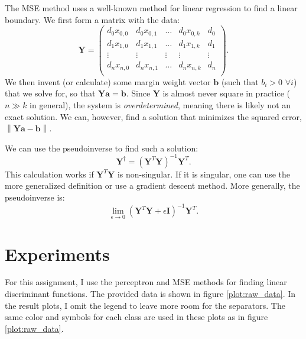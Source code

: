 \documentclass{article}
\begin{document}
The MSE method uses a well-known method for linear regression to find a linear
boundary. We first form a matrix with the data:
\[
	\mathbf{Y} = \left(
	\begin{array}{ccccc}
		d_0x_{0,0} & d_0x_{0,1} & \dots & d_0x_{0,k} & d_0 \\
		d_1x_{1,0} & d_1x_{1,1} & \dots & d_1x_{1,k} & d_1 \\
		\vdots &\vdots &\vdots &\vdots &\vdots \\
		d_nx_{n,0} & d_nx_{n,1} & \dots & d_nx_{n,k} & d_n \\
	\end{array}
	\right).
\]
We then invent (or calculate) some margin weight vector $\mathbf{b}$ (such that
$b_i > 0$ $\forall i$) that we solve for, so that
$\mathbf{Y}\mathbf{a}=\mathbf{b}$. Since $\mathbf{Y}$ is almost never square in
practice ($n\gg k$ in general), the system is {\it overdetermined}, meaning
there is likely not an exact solution. We can, however, find a solution that
minimizes the squared error, $\left\| \mathbf{Y}\mathbf{a} - \mathbf{b}
\right\|$. 

We can use the pseudoinverse to find such a solution:
\[
	\mathbf{Y}^{\dagger} = (\mathbf{Y}^T\mathbf{Y})^{-1} \mathbf{Y}^T.
\]
This calculation works if $\mathbf{Y}^T\mathbf{Y}$ is non-singular. If it is
singular, one can use the more generalized definition or use a gradient descent
method. More generally, the pseudoinverse is:
\[
	\lim_{\epsilon \rightarrow 0} (\mathbf{Y}^T\mathbf{Y} +
\epsilon\mathbf{I})^{-1} \mathbf{Y}^T.
\]

\section{Experiments}

For this assignment, I use the perceptron and MSE methods for finding linear
discriminant functions. The provided data is shown in figure
\ref{plot:raw_data}. In the result plots, I omit the legend to leave more room
for the separators. The same color and symbols for each class are used in these
plots as in figure \ref{plot:raw_data}.
\end{document}

